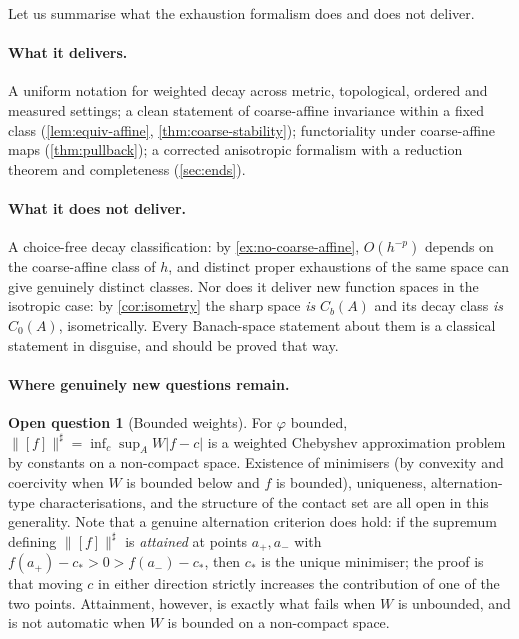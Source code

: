 \documentclass[11pt,a4paper]{article}
\numberwithin{equation}{section}
\theoremstyle{plain}
\theoremstyle{definition}
\newtheorem{question}[theorem]{Open question}
\theoremstyle{remark}
\newcommand{\Cb}{C_b}
\newcommand{\Cz}{C_0}
\begin{document}
Let us summarise what the exhaustion formalism does and does not deliver.

\paragraph{What it delivers.} A uniform notation for weighted decay across metric,
topological, ordered and measured settings; a clean statement of coarse-affine invariance
within a fixed class (\cref{lem:equiv-affine}, \cref{thm:coarse-stability}); functoriality
under coarse-affine maps (\cref{thm:pullback}); a corrected anisotropic formalism with a
reduction theorem and completeness (\cref{sec:ends}).

\paragraph{What it does not deliver.} A choice-free decay classification: by
\cref{ex:no-coarse-affine}, $O(h^{-p})$ depends on the coarse-affine class of $h$, and
distinct proper exhaustions of the same space can give genuinely distinct classes. Nor
does it deliver new function spaces in the isotropic case: by \cref{cor:isometry} the
sharp space \emph{is} $\Cb(A)$ and its decay class \emph{is} $\Cz(A)$, isometrically. Every
Banach-space statement about them is a classical statement in disguise, and should be
proved that way.

\paragraph{Where genuinely new questions remain.}

\begin{question}[Bounded weights]\label{q:bounded-phi}
For $\varphi$ bounded, $\|[f]\|^{\sharp}=\inf_c\sup_AW|f-c|$ is a weighted Chebyshev
approximation problem by constants on a non-compact space. Existence of minimisers (by
convexity and coercivity when $W$ is bounded below and $f$ is bounded), uniqueness,
alternation-type characterisations, and the structure of the contact set are all open in
this generality. Note that a genuine alternation criterion does hold: if the supremum
defining $\|[f]\|^{\sharp}$ is \emph{attained} at points $a_+,a_-$ with
$f(a_+)-c_\ast>0>f(a_-)-c_\ast$, then $c_\ast$ is the unique minimiser; the proof is that
moving $c$ in either direction strictly increases the contribution of one of the two
points. Attainment, however, is exactly what fails when $W$ is unbounded, and is not
automatic when $W$ is bounded on a non-compact space.
\end{question}
\end{document}

